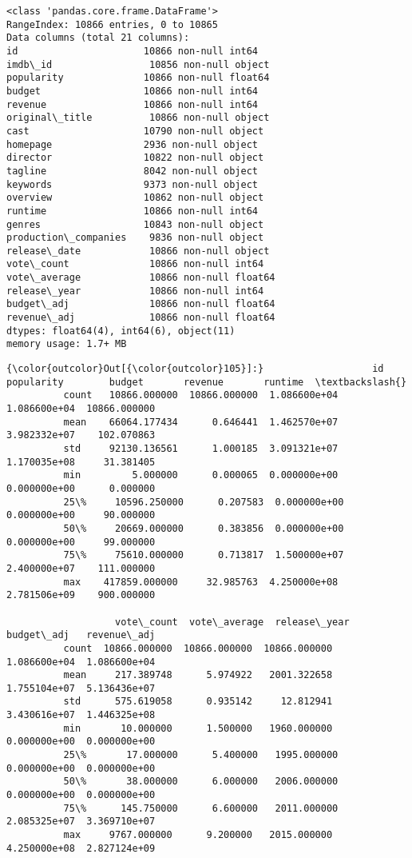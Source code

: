 \documentclass[11pt]{article}
\begin{document}
    \begin{Verbatim}[commandchars=\\\{\}]
<class 'pandas.core.frame.DataFrame'>
RangeIndex: 10866 entries, 0 to 10865
Data columns (total 21 columns):
id                      10866 non-null int64
imdb\_id                 10856 non-null object
popularity              10866 non-null float64
budget                  10866 non-null int64
revenue                 10866 non-null int64
original\_title          10866 non-null object
cast                    10790 non-null object
homepage                2936 non-null object
director                10822 non-null object
tagline                 8042 non-null object
keywords                9373 non-null object
overview                10862 non-null object
runtime                 10866 non-null int64
genres                  10843 non-null object
production\_companies    9836 non-null object
release\_date            10866 non-null object
vote\_count              10866 non-null int64
vote\_average            10866 non-null float64
release\_year            10866 non-null int64
budget\_adj              10866 non-null float64
revenue\_adj             10866 non-null float64
dtypes: float64(4), int64(6), object(11)
memory usage: 1.7+ MB

    \end{Verbatim}

\begin{Verbatim}[commandchars=\\\{\}]
{\color{outcolor}Out[{\color{outcolor}105}]:}                   id    popularity        budget       revenue       runtime  \textbackslash{}
          count   10866.000000  10866.000000  1.086600e+04  1.086600e+04  10866.000000   
          mean    66064.177434      0.646441  1.462570e+07  3.982332e+07    102.070863   
          std     92130.136561      1.000185  3.091321e+07  1.170035e+08     31.381405   
          min         5.000000      0.000065  0.000000e+00  0.000000e+00      0.000000   
          25\%     10596.250000      0.207583  0.000000e+00  0.000000e+00     90.000000   
          50\%     20669.000000      0.383856  0.000000e+00  0.000000e+00     99.000000   
          75\%     75610.000000      0.713817  1.500000e+07  2.400000e+07    111.000000   
          max    417859.000000     32.985763  4.250000e+08  2.781506e+09    900.000000   
          
                   vote\_count  vote\_average  release\_year    budget\_adj   revenue\_adj  
          count  10866.000000  10866.000000  10866.000000  1.086600e+04  1.086600e+04  
          mean     217.389748      5.974922   2001.322658  1.755104e+07  5.136436e+07  
          std      575.619058      0.935142     12.812941  3.430616e+07  1.446325e+08  
          min       10.000000      1.500000   1960.000000  0.000000e+00  0.000000e+00  
          25\%       17.000000      5.400000   1995.000000  0.000000e+00  0.000000e+00  
          50\%       38.000000      6.000000   2006.000000  0.000000e+00  0.000000e+00  
          75\%      145.750000      6.600000   2011.000000  2.085325e+07  3.369710e+07  
          max     9767.000000      9.200000   2015.000000  4.250000e+08  2.827124e+09  
\end{Verbatim}
            
\end{document}
